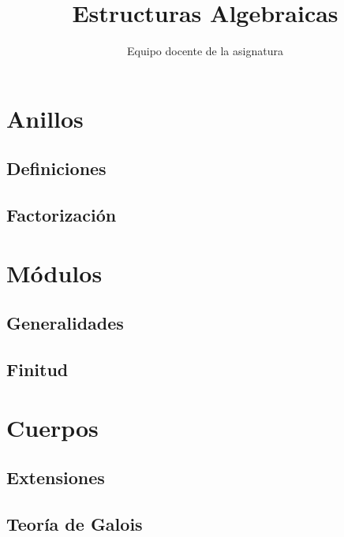 \documentclass[12pt]{book}
\title{Estructuras Algebraicas}
\author{Equipo docente de la asignatura}
\let\section\chapter
\theoremstyle{definition}
\theoremstyle{remark}
\numberwithin{equation}{section}
\begin{document}
 
\maketitle

\tableofcontents

\part{Anillos}



\section{Definiciones}



\section{Factorización}



\part{Módulos}



\section{Generalidades}



\section{Finitud}



\part{Cuerpos}



\section{Extensiones}



\section{Teoría de Galois}


\end{document}
